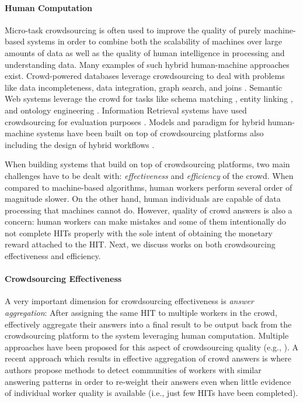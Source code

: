 \paragraph{Human Computation}
Micro-task crowdsourcing is often used to improve the quality of purely machine-based systems in order to combine both the scalability of machines over large amounts of data as well as the quality of human intelligence in processing and understanding data.
Many examples of such hybrid human-machine approaches exist.
% 
Crowd-powered databases \cite{crowddb} leverage crowdsourcing to deal with problems like  data incompleteness,  data integration, graph search, and joins \cite{crowder,graphsearch,crowdjoins}.
% 
Semantic Web systems leverage the crowd for tasks like schema matching \cite{crowdmap}, entity linking \cite{zencrowd}, and ontology engineering \cite{bioonto}.
% 
Information Retrieval systems have used crowdsourcing for evaluation purposes \cite{mizzaroalonso}.
% 
Models and paradigm for hybrid human-machine systems have been built on top of crowdsourcing platforms \cite{crowdcomputer} also including the design of hybrid workflows \cite{workflows}.

When building systems that build on top of crowdsourcing platforms, two main challenges have to be dealt with: \emph{effectiveness} and \emph{efficiency}  of the crowd. When compared to machine-based algorithms, human workers perform several order of magnitude slower. On the other hand, human individuals are capable of data processing that machines cannot do. However, quality of crowd answers is also a concern: human workers can make mistakes and some of them intentionally do not complete HITs properly with the sole intent of obtaining the monetary reward attached to the HIT. Next, we discuss works on both crowdsourcing effectiveness and efficiency.





\paragraph{Crowdsourcing Effectiveness}
A very important dimension for crowdsourcing effectiveness is \emph{answer aggregation}: After assigning the same HIT to multiple workers in the crowd, effectively aggregate their answers into a final result to be output back from the crowdsourcing platform to the system leveraging human computation. Multiple approaches have been proposed for this aspect of crowdsourcing quality (e.g.,
\cite{Venanzi:2014:CBA:2566486.2567989,square,zencrowd,Hosseini:2012:ALM:2260641.2260661}).
% 
A recent approach which results in effective aggregation of crowd answers is \cite{Venanzi:2014:CBA:2566486.2567989} where authors propose methods to detect communities of workers with similar answering patterns in order to re-weight their answers even when little evidence of individual worker quality is available (i.e., just few HITs have been completed).

